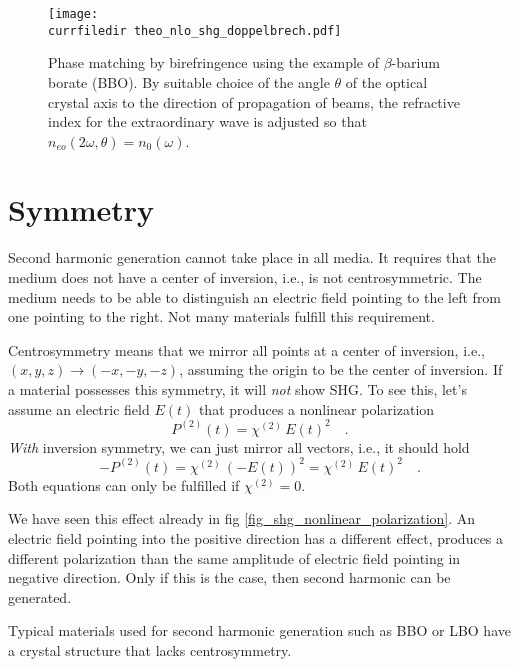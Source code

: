 \begin{figure}
\center
\texttt{[image: \\currfiledir theo\_nlo\_shg\_doppelbrech.pdf]}
\caption{Phase matching by birefringence using the example of
$\beta$-barium borate (BBO). By suitable choice of the angle
$\theta$ of the optical crystal axis to the direction of propagation of
beams, the refractive index for the extraordinary wave is adjusted
so that $n_{eo}(2 \omega, \theta) = n_0(\omega)$. }
\label{fig_shg_birefringence}

\end{figure}



\section{Symmetry}

Second harmonic generation cannot take place in all media. It requires that the medium does not have a center of inversion, i.e., is not centrosymmetric. The medium needs to be able to distinguish an electric field pointing to the left from one pointing to the right. Not many materials fulfill this requirement.

Centrosymmetry means that we  mirror all points at a center of inversion, i.e., $(x,y,z) \rightarrow (-x, -y, -z)$, assuming the origin to be the center of inversion. If a material possesses  this symmetry, it will \emph{not} show SHG. To see this, let's assume an electric field $E(t)$ that produces a nonlinear polarization
\begin{equation}
P^{(2)}(t) = \chi^{(2)} \, E(t)^2 \quad .
\end{equation}
\emph{With} inversion symmetry, we can just mirror all vectors, i.e., it should hold
\begin{equation}
- P^{(2)}(t) = \chi^{(2)} \, \left( - E(t) \right)^2 = \chi^{(2)} \, E(t)^2  \quad .
\end{equation}
Both equations can only be fulfilled if $ \chi^{(2)} =0$.

We have seen this effect already in fig \ref{fig_shg_nonlinear_polarization}. An electric field pointing into the positive direction has a different effect, produces a different polarization than the same amplitude of electric field pointing in negative direction. Only if this is the case, then second harmonic can be generated.


Typical materials used for second harmonic generation such as BBO or LBO have a crystal structure that lacks centrosymmetry.


